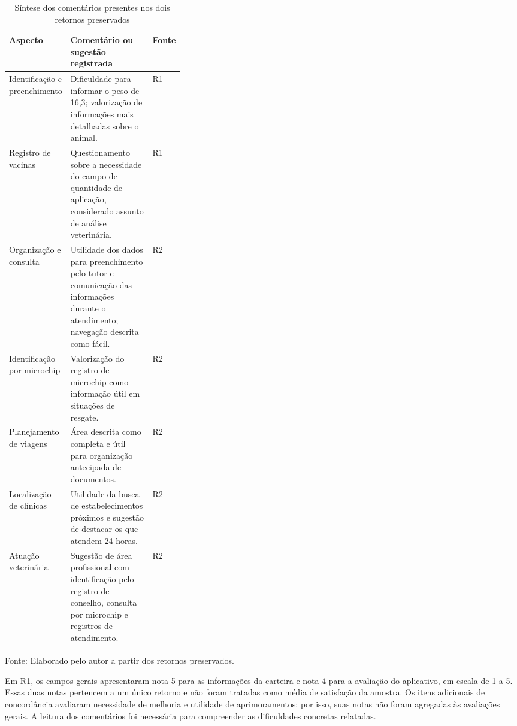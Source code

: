 \documentclass{UNESC}
\begin{document}
\begin{table}[htbp]
\centering
\caption{Síntese dos comentários presentes nos dois retornos preservados}
\label{tab:resumo_qualitativo}
\small
\setlength{\tabcolsep}{4pt}
\renewcommand{\arraystretch}{1.15}
\begin{tabular}{@{}p{0.24\linewidth} p{} p{0.10\linewidth}@{}}
\hline
\textbf{Aspecto} & \textbf{Comentário ou sugestão registrada} & \textbf{Fonte} \\
\hline
Identificação e preenchimento & Dificuldade para informar o peso de 16,3; valorização de informações mais detalhadas sobre o animal. & R1 \\
Registro de vacinas & Questionamento sobre a necessidade do campo de quantidade de aplicação, considerado assunto de análise veterinária. & R1 \\
Organização e consulta & Utilidade dos dados para preenchimento pelo tutor e comunicação das informações durante o atendimento; navegação descrita como fácil. & R2 \\
Identificação por microchip & Valorização do registro de microchip como informação útil em situações de resgate. & R2 \\
Planejamento de viagens & Área descrita como completa e útil para organização antecipada de documentos. & R2 \\
Localização de clínicas & Utilidade da busca de estabelecimentos próximos e sugestão de destacar os que atendem 24 horas. & R2 \\
Atuação veterinária & Sugestão de área profissional com identificação pelo registro de conselho, consulta por microchip e registros de atendimento. & R2 \\
\hline
\end{tabular}
\par\vspace{2pt}
{\footnotesize\raggedright Fonte: Elaborado pelo autor a partir dos retornos preservados.\par}
\end{table}

Em R1, os campos gerais apresentaram nota 5 para as informações da carteira e nota 4 para a avaliação do aplicativo, em escala de 1 a 5. Essas duas notas pertencem a um único retorno e não foram tratadas como média de satisfação da amostra. Os itens adicionais de concordância avaliaram necessidade de melhoria e utilidade de aprimoramentos; por isso, suas notas não foram agregadas às avaliações gerais. A leitura dos comentários foi necessária para compreender as dificuldades concretas relatadas.
\end{document}
